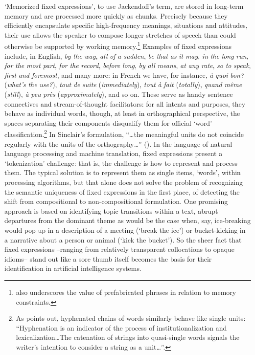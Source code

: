 \documentclass[output=paper]{langsci/langscibook}
\begin{document}
‘Memorized fixed expressions’, to use Jackendoff’s term, are stored in long-term memory and are processed more quickly as chunks. Precisely because they efficiently encapsulate specific high-frequency meanings, situations and attitudes, their use allows the speaker to compose longer stretches of speech than could otherwise be supported by working memory.\footnote{ \textrm{\citet{bolinger_meaning_1976} also underscores the value of prefabricated phrases in relation to memory constraints.}} Examples of fixed expressions include, in English, \textit{by} \textit{the} \textit{way}, \textit{all} \textit{of} \textit{a} \textit{sudden}, \textit{be} \textit{that} \textit{as} \textit{it} \textit{may}, \textit{in} \textit{the} \textit{long} \textit{run}, \textit{for} \textit{the} \textit{most} \textit{part}, \textit{for} \textit{the} \textit{record}, \textit{before} \textit{long}, \textit{by} \textit{all} \textit{means}, \textit{at} \textit{any} \textit{rate}, \textit{so} \textit{to} \textit{speak}, \textit{first} \textit{and} \textit{foremost}, and many more: in French we have, for instance, \textit{à} \textit{quoi} \textit{bon?} (\textit{what’s} \textit{the} \textit{use?}), \textit{tout} \textit{de} \textit{suite} (\textit{immediately}), \textit{tout} \textit{à} \textit{fait} (\textit{totally}), \textit{quand} \textit{même} (\textit{still}), \textit{à} \textit{peu} \textit{près} (\textit{approximately}), and so on. These serve as handy sentence connectives and stream-of-thought facilitators: for all intents and purposes, they behave as individual words, though, at least in orthographical perspective, the spaces separating their components disqualify them for official ‘word’ classification.\footnote{ \textrm{As \citet[43]{moon_fixed_1998} points out, hyphenated chains of words similarly behave like single units: “Hyphenation is an indicator of the process of institutionalization and lexicalization…The catenation of strings into quasi-single words signals the writer’s intention to consider a string as a unit…”.}} In Sinclair’s formulation, “…the meaningful units do not coincide regularly with the units of the orthography…” (\citeyear[410]{granger_phrase_2008}). In the language of natural language processing and machine translation, fixed expressions present a ‘tokenization’ challenge: that is, the challenge is how to represent and process them. The typical solution is to represent them as single items, ‘words’, within processing algorithms, but that alone does not solve the problem of recognizing the semantic uniqueness of fixed expressions in the first place, of detecting the shift from compositional to non-compositional formulation. One promising approach is based on identifying topic transitions within a text, abrupt departures from the dominant theme as would be the case when, say, ice-breaking would pop up in a description of a meeting (‘break the ice’) or bucket-kicking in a narrative about a person or animal (‘kick the bucket’). So the sheer fact that fixed expressions –ranging from relatively transparent collocations to opaque idioms– stand out like a sore thumb itself becomes the basis for their identification in artificial intelligence systems.
\end{document}
